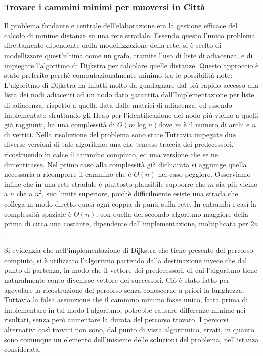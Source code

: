 \documentclass[a4paper,11pt]{Article}
\begin{document}
\subsubsection{Trovare i cammini minimi per muoversi in Città}

Il problema fondante e centrale dell'elaborazione era la gestione efficace del calcolo di minime distanze su una rete stradale. Essendo questo l'unico problema direttamente dipendente dalla modellizzazione della rete, si è scelto di modellizzare quest'ultima come un grafo, tramite l'uso di liste di adiacenza, e di impiegare l'algoritmo di Dijkstra per calcolare quelle distanze. Questo approccio è stato preferito perchè computazionalmente minimo tra le possibilità note: L'algoritmo di Dijkstra ha infatti molto da guadagnare dal più rapido accesso alla lista dei nodi adiacenti ad un nodo dato garantita dall'Implementazione per liste di adiacenza, rispetto a quella data dalle matrici di adiacenza, ed essendo implementato sfruttando gli Heap per l'identificazione del nodo più vicino a quelli già raggiunti, ha una complessità di $O(m\log{}n)$dove $m$ è il numero di archi e $n$ di vertici.
Nella risoluzione del problema sono state Tuttavia impegate due diverse versioni di tale algoritmo: una che tenesse traccia dei predecessori, ricostruendo in calce il cammino compiuto, ed una versione che se ne dimenticasse.
Nel primo caso alla complessità già dichiarata si aggiunge quella necessaria a ricomporre il cammino che è $O(n)$ nel caso peggiore.
Osserviamo infine che in una rete stradale è piuttosto plausibile supporre che $m$ sia più vicino a $n$ che a $n^2$, suo limite superiore, poichè difficilmente esiste una strada che collega in modo diretto quasi ogni coppia di punti sulla rete.
In entrambi i casi la complessità spaziale è $\Theta(n)$, con quella del secondo algoritmo maggiore della prima di circa una costante, dipendente dall'implementazione, moltiplicata per $2n$.

Si evidenzia che nell'implementazione di Dijkstra che tiene presente del percorso compiuto, si è utilizzato l'algoritmo partendo dalla destinazione invece che dal punto di partenza, in modo che il vettore dei predecessori, di cui l'algoritmo tiene naturalmente conto divenisse vettore dei successori. Ciò è stato fatto per agevolare la ricostruzione del percorso senza conoscerne a priori la lunghezza.
Tuttavia la falsa assunzione che il cammino minimo fosse unico, fatta prima di implementare in tal modo l'algoritmo, potrebbe causare differenze minime nei risultati, senza però aumentare la durata del percorso trovato. I percorsi alternativi così trovati non sono, dal punto di vista algoritmico, errati, in quanto sono comunque un elemento dell'inisieme delle soluzioni del problema, nell'istanza considerata.
\end{document}
